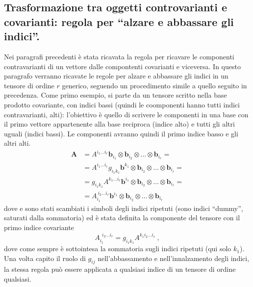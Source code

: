 
 \subsection{Trasformazione tra oggetti controvarianti e covarianti: regola per ``alzare e abbassare gli indici''.}
 Nei paragrafi precedenti è stata ricavata la regola per ricavare le componenti contravarianti di un vettore dalle compontenti
 covarianti e viceversa. In questo paragrafo verranno ricavate le regole per alzare e abbassare gli indici in un tensore di 
 ordine $r$ generico, seguendo un procedimento simile a quello seguito in precedenza.
 Come primo esempio, si parte da un tensore scritto nella base prodotto covariante, con indici bassi
 (quindi le coomponenti hanno tutti indici contravarianti, alti): l'obiettivo è quello di scrivere le componenti in una base con il primo vettore
 appartenente alla base reciproca (indice alto) e tutti gli altri uguali (indici bassi). Le componenti avranno quindi il primo
 indice basso e gli altri alti.
 \begin{equation}
 \begin{aligned}
  \bm{A} & = A^{i_1 \dots i_r} \bm{b}_{i_1} \otimes \bm{b}_{i_2} \otimes \dots \otimes \bm{b}_{i_r} = \\
         & = A^{i_1 \dots i_r} g_{i_1 k_1} \bm{b}^{k_1} \otimes \bm{b}_{i_2} \otimes \dots \otimes \bm{b}_{i_r} = \\
         & = g_{i_1 k_1}A^{k_1 \dots i_r} \bm{b}^{i_1} \otimes \bm{b}_{i_2} \otimes \dots \otimes \bm{b}_{i_r} = \\
         & = A_{i_1}^{\ i_2 \dots i_r} \bm{b}^{i_1} \otimes \bm{b}_{i_2} \otimes \dots \otimes \bm{b}_{i_r}
 \end{aligned}
 \end{equation}
 dove e sono stati scambiati i simboli degli indici ripetuti (sono indici ``dummy'',
 saturati dalla sommatoria) ed è stata definita la componente del tensore con il primo indice covariante
 \begin{equation}\label{eqn:t2td}
   A_{i_1}^{\ \ i_2\dots i_r} = g_{i_1 k_1} A^{k_1 i_2 \dots i_r} \ ,
 \end{equation}
 dove come sempre è sottointesa la sommatoria sugli indici ripetuti (qui solo $k_1$). Una volta capito il ruolo di $g_{ij}$ nell'abbassamento
 e nell'innalzamento degli indici, la stessa regola può essere applicata a qualsiasi indice di un tensore di ordine qualsiasi.

